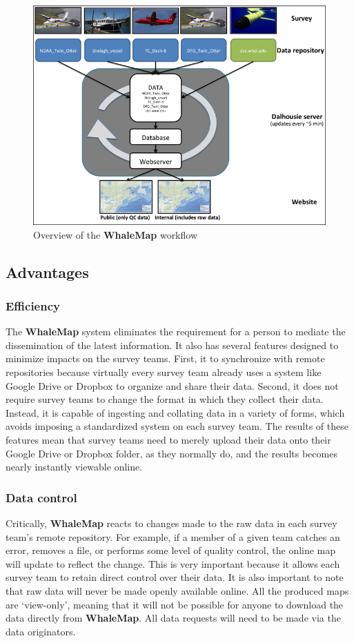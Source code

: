 \documentclass[11pt, letterpaper]{article}
\begin{document}
\begin{figure}[h]
	\centering
	\includegraphics[width=0.7\linewidth]{diagram}
	\caption{Overview of the \textbf{WhaleMap} workflow}
	\label{fig:outline}
\end{figure}

\subsection{Advantages}

\subsubsection{Efficiency}

The \textbf{WhaleMap} system eliminates the requirement for a person to mediate the dissemination of the latest information. It also has several features designed to minimize impacts on the survey teams. First, it to synchronize with remote repositories because virtually every survey team already uses a system like Google Drive or Dropbox to organize and share their data. Second, it does not require survey teams to change the format in which they collect their data. Instead, it is capable of ingesting and collating data in a variety of forms, which avoids imposing a standardized system on each survey team. The results of these features mean that survey teams need to merely upload their data onto their Google Drive or Dropbox folder, as they normally do, and the results becomes nearly instantly viewable online.

\subsubsection{Data control}

Critically, \textbf{WhaleMap} reacts to changes made to the raw data in each survey team's remote repository. For example, if a member of a given team catches an error, removes a file, or performs some level of quality control, the online map will update to reflect the change. This is very important because it allows each survey team to retain direct control over their data. It is also important to note that raw data will never be made openly available online. All the produced maps are `view-only', meaning that it will not be possible for anyone to download the data directly from \textbf{WhaleMap}. All data requests will need to be made via the data originators.
\end{document}
